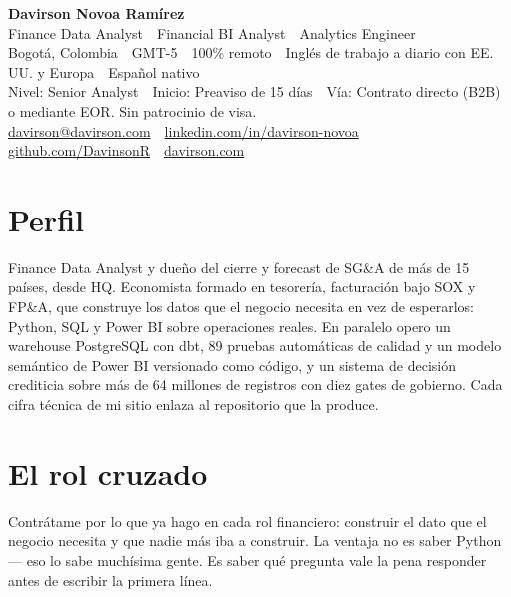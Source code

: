 \documentclass[a4paper,10pt]{article}
\begin{document}
\begin{center}
  {\Large\bfseries\color{ink} Davirson Novoa Ramírez}\\[2pt]
  {\normalsize\color{cold} Finance Data Analyst \,\textperiodcentered\, Financial BI Analyst \,\textperiodcentered\, Analytics Engineer}\\[3pt]
  {\small Bogotá, Colombia \,\textperiodcentered\, GMT-5 \,\textperiodcentered\, 100\% remoto \,\textperiodcentered\, Inglés de trabajo a diario con EE. UU. y Europa \,\textperiodcentered\, Español nativo}\\[2pt]
  {\small\color{cold} Nivel: Senior Analyst \,\textperiodcentered\, Inicio: Preaviso de 15 días \,\textperiodcentered\, Vía: Contrato directo (B2B) o mediante EOR. Sin patrocinio de visa.}\\[2pt]
  {\small \href{mailto:davirson@davirson.com}{davirson@davirson.com} \,\textperiodcentered\, \href{https://linkedin.com/in/davirson-novoa}{linkedin.com/in/davirson-novoa} \,\textperiodcentered\, \href{https://github.com/DavinsonR}{github.com/DavinsonR} \,\textperiodcentered\, \href{https://davirson.com/es}{davirson.com}}
\end{center}

\section*{Perfil}
Finance Data Analyst y dueño del cierre y forecast de SG\&A de más de 15 países, desde HQ. Economista formado en tesorería, facturación bajo SOX y FP\&A, que construye los datos que el negocio necesita en vez de esperarlos: Python, SQL y Power BI sobre operaciones reales. En paralelo opero un warehouse PostgreSQL con dbt, 89 pruebas automáticas de calidad y un modelo semántico de Power BI versionado como código, y un sistema de decisión crediticia sobre más de 64 millones de registros con diez gates de gobierno. Cada cifra técnica de mi sitio enlaza al repositorio que la produce.

\section*{El rol cruzado}
Contrátame por lo que ya hago en cada rol financiero: construir el dato que el negocio necesita y que nadie más iba a construir. La ventaja no es saber Python --- eso lo sabe muchísima gente. Es saber qué pregunta vale la pena responder antes de escribir la primera línea.
\end{document}
